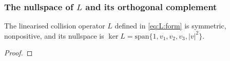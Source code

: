 \subsubsection{The nullspace of \texorpdfstring{$L$}{L} and its orthogonal complement}
\begin{theorem}\label{th:kerL}  The linearised collision operator $L$ defined in \eqref{eq:L:form} is symmetric, nonpositive, and its nullspace is $\ker L = \mbox{span}\{1,v_1,v_2,v_3,|v|^2\}$. 
\end{theorem}
\begin{proof}



\end{proof}
